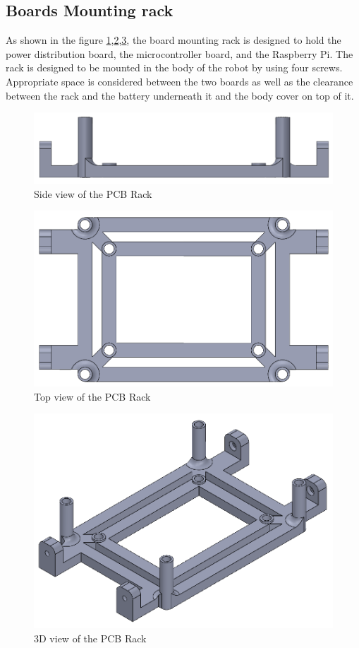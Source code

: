 \newpage
\subsection{Boards Mounting rack}
As shown in the figure \ref{fig:pcbrack1},\ref{fig:pcbrack2},\ref{fig:pcbrack3}, the board mounting rack is designed to hold the power distribution board, the microcontroller board, and the Raspberry Pi.
The rack is designed to be mounted in the body of the robot by using four screws.
Appropriate space is considered between the two boards as well as the clearance between the rack and the battery underneath it and the body cover on top of it.
\begin{figure}[h]
	\centering
	\includegraphics[width=.7\linewidth]{PCB_Rack_1}
	\caption[Side view of the PCB Rack]{Side view of the PCB Rack}
	\label{fig:pcbrack1}
\end{figure}
\begin{figure}[h]
	\centering
	\includegraphics[width=.7\linewidth]{PCB_Rack_2}
	\caption[Top view of the PCB Rack]{Top view of the PCB Rack}
	\label{fig:pcbrack2}
\end{figure}
\begin{figure}[h]
	\centering
	\includegraphics[width=.7\linewidth]{PCB_Rack_3}
	\caption[3D view of the PCB Rack]{3D view of the PCB Rack}
	\label{fig:pcbrack3}
\end{figure}
\newpage
